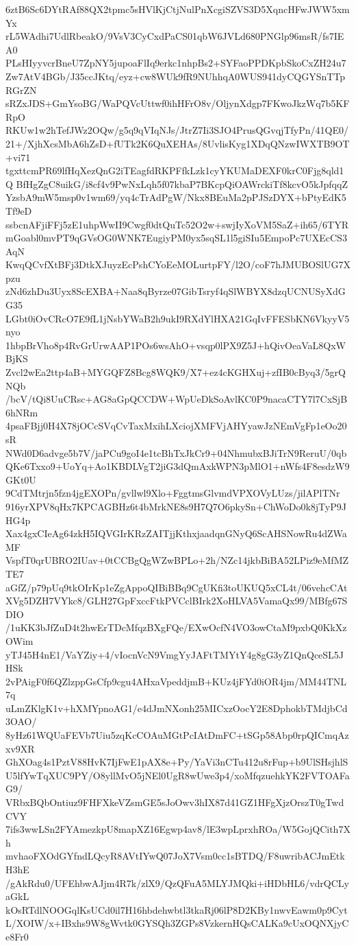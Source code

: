 6ztB6Sc6DYtRAf88QX2tpmc5sHVlKjCtjNulPnXcgiSZVS3D5XqncHFwJWW5xmYx
rL5WAdhi7UdlRbeakO/9VsV3CyCxdPaCS01qbW6JVLd680PNGlp96msR/fs7IEA0
PLsHIyyvcrBneU7ZpNY5jupoaFlIq9erkc1nhpBs2+SYFaoPPDKpbSkoCxZH24u7
Zw7AtV4BGb/J35ccJKtq/eyz+cw8WUk9fR9NUhhqA0WUS941dyCQGYSnTTpRGrZN
sRZxJDS+GmYsoBG/WaPQVcUttwf0ihHFrO8v/OljynXdgp7FKwoJkzWq7b5KFRpO
RKUw1w2hTefJWz2OQw/g5q9qVIqNJs/JtrZ7Ii3SJO4PrusQGvqjTfyPn/41QE0/
21+/XjhXcsMbA6hZsD+fUTk2K6QuXEHAs/8UvlisKyg1XDqQNzwIWXTB9OT+vi71
tgxttcmPR69lfHqXezQnG2iTEagfdRKPFfkLzk1cyYKUMaDEXF0krC0Fjg8qld1Q
BfHgZgC8uikG/i8cf4v9PwNxLqh5f07kbaP7BKcpQiOAWrckiTf8kcvO5kJpfqqZ
YzsbA9mW5msp0v1wm69/yq4cTrAdPgW/Nkx8BEuMa2pPJSzDYX+bPtyEdK5Tf9eD
ssbcnAFjiFFj5zE1uhpWwII9Cwgf0dtQuTc52O2w+swjIyXoVM5SaZ+ih65/6TYR
mGoabl0mvPT9qGVsOG0WNK7EugiyPM0yx5sqSL1l5giSIu5EmpoPc7UXEcCS3AqN
KwqQCvfXtBFj3DtkXJuyzEcPshCYoEeMOLurtpFY/l2O/coF7hJMUBOSlUG7Xpzu
zNd6zhDu3Uyx8ScEXBA+Naa8qByrze07GibTsryf4qSlWBYX8dzqUCNUSyXdGG35
LGbt0iOvCRcO7E9fL1jNsbYWaB2h9ukI9RXdYlHXA21GqIvFFESbKN6VkyyV5nyo
1hbpBrVho8p4RvGrUrwAAP1POs6wsAhO+vsqp0lPX9Z5J+hQivOeaVaL8QxWBjKS
Zvcl2wEa2ttp4aB+MYGQFZ8Bcg8WQK9/X7+ez4cKGHXuj+zfIB0cByq3/5grQNQb
/bcV/tQi8UuCRsc+AG8aGpQCCDW+WpUeDkSoAvlKC0P9nacaCTY7l7CxSjB6hNRm
4psaFBjj0H4X78jOCcSVqCvTaxMxihLXciojXMFVjAHYyawJzNEmVgFp1eOo20sR
NWd0D6advge5b7V/jaPCu9goI4e1tcBhTxJkCr9+04NhmubxBJiTrN9ReruU/0qb
QKe6Txxo9+UoYq+Ao1KBDLVgT2jiG3dQmAxkWPN3pMlO1+nWfs4F8esdzW9GKt0U
9CdTMtrjn5fzn4jgEXOPn/gvllwl9Xlo+FggtmsGlvmdVPXOVyLUzs/jilAPlTNr
916yrXPV8qHx7KPCAGBHz6t4bMrkNE8s9H7Q7O6pkySn+ChWoDo0k8jTyP9JHG4p
Xax4gxCIeAg64zkH5IQVGIrKRzZAITjjKthxjaadqnGNyQ6ScAHSNowRu4dZWaMF
VspfT0qrUBRO2IUav+0tCCBgQgWZwBPLo+2h/NZc14jkbBiBA52LPiz9eMfMZTE7
aGfZ/p79pUq9tkOIrKp1eZgAppoQIBiBBq9CgUKfi3toUKUQ5xCL4t/06vehcCAt
XVg5DZH7VYkc8/GLH27GpFxccFtkPVCclBIrk2XoHLVA5VamaQx99/MBfg67SDIO
/1uKK3bJfZuD4t2hwErTDcMfqzBXgFQe/EXwOcfN4VO3owCtaM9pxbQ0KkXzOWim
yTJ45H4nE1/VaYZiy+4/vIocnVcN9VmgYyJAFtTMYtY4g8gG3yZ1QnQceSL5JHSk
2vPAigF0f6QZlzppGsCfp9cgu4AHxaVpeddjmB+KUz4jFYd0iOR4jm/MM44TNL7q
uLmZKlgK1v+hXMYpnoAG1/e4dJmNXonh25MICxzOocY2E8DphokbTMdjbCd3OAO/
8yHz61WQUaFEVb7Uiu5zqKcCOAuMGtPcIAtDmFC+tSGp58Abp0rpQICmqAzxv9XR
GhXOag4s1PztV88HvK7IjFwE1pAX8e+Py/YaVi3nCTu412u8rFup+b9UlSHsjhlS
U5lfYwTqXUC9PY/O8yllMvO5jNEl0UgR8wUwe3p4/xoMfqzuehkYK2FVTOAFaG9/
VRbxBQbOntiuz9FHFXkeVZsmGE5sJoOwv3hIX87d41GZ1HFgXjzOrszT0gTwdCVY
7ifs3wwLSn2FYAmezkpU8mapXZ16Egwp4av8/lE3wpLprxhROa/W5GojQCith7Xh
mvhaoFXOdGYfndLQcyR8AVtIYwQ07JoX7Vsm0cc1sBTDQ/F8uwribACJmEtkH3hE
/gAkRdu0/UFEhbwAJjm4R7k/zlX9/QzQFuA5MLYJMQki+iHDbHL6/vdrQCLyaGkL
kOsRTdlNOOGqlKsUCd0il7H16hbdehwbtl3tkaRj06lP8D2KBy1nwvEawm0p9Cyt
L/XOIW/x+IBxhs9W8gWvtk0GYSQh3ZGPs8VzkernHQsCALKa9cUxOQNXjyCe8Fr0
